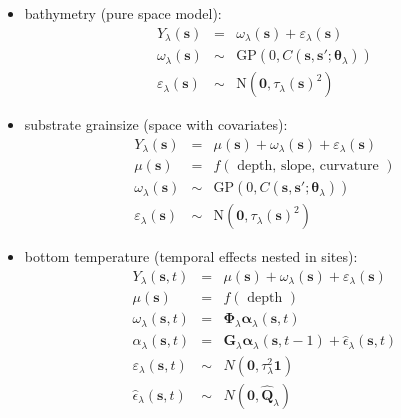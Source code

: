 \documentclass[letterpaper,portrait,11pt]{scrartcl}
\numberwithin{equation}{section}    %
\numberwithin{figure}{section}    %
\numberwithin{table}{section}       %
\begin{document}
\begin{itemize}
\item bathymetry (pure space model): 
  \begin{eqnarray*}
    Y_\lambda(\bm{s}) &=& \omega_\lambda(\bm{s}) + \varepsilon_\lambda(\bm{s}) \\
    \omega_\lambda(\bm{s}) &\sim& \textrm{GP}(0, C(\bm{s},\bm{s}'; \bm{\theta}_\lambda))  \\
    \varepsilon_\lambda(\bm{s}) &\sim& \textrm{N}( \bm{0}, \tau_\lambda(\bm{s})^2) 
  \end{eqnarray*}
   
\item substrate grainsize (space with covariates): 
  \begin{eqnarray*}
   Y_\lambda(\bm{s}) &=& \mu(\bm{s}) + \omega_\lambda(\bm{s}) + \varepsilon_\lambda(\bm{s}) \\
   \mu(\bm{s}) &=& f ( \text{ depth, slope, curvature } ) \\
   \omega_\lambda(\bm{s}) &\sim& \textrm{GP}(0, C(\bm{s},\bm{s}'; \bm{\theta}_\lambda))  \\
   \varepsilon_\lambda(\bm{s}) &\sim& \textrm{N}(\bm{0}, \tau_\lambda(\bm{s})^2) 
 \end{eqnarray*}
  
\item bottom temperature (temporal effects nested in sites): 
  \begin{eqnarray*}
  Y_\lambda(\bm{s},t) &=& \mu(\bm{s}) + \omega_\lambda(\bm{s}) + \varepsilon_\lambda(\bm{s}) \\
  \mu(\bm{s}) &=& f ( \text{ depth } ) \\
  \omega_\lambda(\bm{s},t) &=& \bm{\Phi}_\lambda \bm{\alpha}_\lambda (\bm{s},t)  \\
  \alpha_\lambda(\bm{s},t)&=& \bm{G}_\lambda \bm{\alpha}_\lambda (\bm{s},t-1) + \hat{\epsilon}_\lambda(\bm{s},t)  \\
  \varepsilon_\lambda(\bm{s},t) &\sim& N(\bm{0}, \tau_\lambda^2 \bm{1} )  \\
  \hat{\epsilon}_\lambda(\bm{s},t) &\sim& N(\bm{0}, \bm{\hat{Q}}_\lambda)  
  \end{eqnarray*}


\end{itemize}
\end{document}
